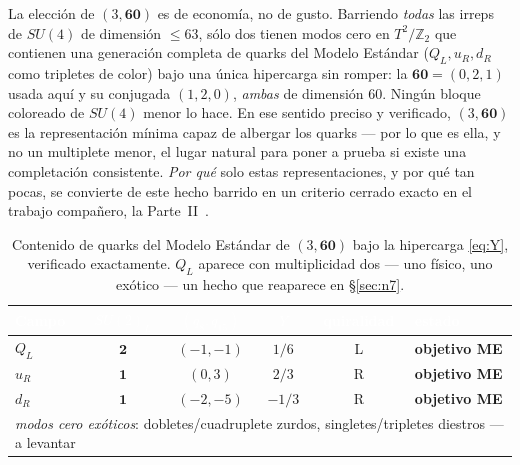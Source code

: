 \documentclass[11pt,a4paper]{article}
\begin{document}
La elecci\'on de $(3,\mathbf{60})$ es de econom\'ia, no de gusto. Barriendo \emph{todas}
las irreps de $SU(4)$ de dimensi\'on $\le 63$, s\'olo dos tienen modos cero en
$T^2/\mathbb{Z}_2$ que contienen una generaci\'on completa de quarks del Modelo Est\'andar
($Q_L,u_R,d_R$ como tripletes de color) bajo una \'unica hipercarga sin romper: la
$\mathbf{60}=(0,2,1)$ usada aqu\'i y su conjugada $(1,2,0)$, \emph{ambas} de dimensi\'on
$60$. Ning\'un bloque coloreado de $SU(4)$ menor lo hace. En ese sentido preciso y
verificado, $(3,\mathbf{60})$ es la representaci\'on m\'inima capaz de albergar los quarks
--- por lo que es ella, y no un multiplete menor, el lugar natural para poner a prueba si
existe una completaci\'on consistente. \emph{Por qu\'e} solo estas representaciones, y por
qu\'e tan pocas, se convierte de este hecho barrido en un criterio cerrado exacto en el
trabajo compa\~nero, la Parte~II~\cite{PartII}.

\begin{table}[t]
\centering
{}
\begin{tabular}{lccccl}
\toprule
\rowcolor{hdrblue}
\textcolor{white}{Campo} & \textcolor{white}{$SU(2)_L$} & \textcolor{white}{$(q_8,q_{15})$}
& \textcolor{white}{$Y$} & \textcolor{white}{quiralidad} & \textcolor{white}{estado}\\
\midrule
$Q_L$   & $\mathbf{2}$ & $(-1,-1)$ & $1/6$  & L & \textcolor{okgreen}{\textbf{objetivo ME}}\\
$u_R$   & $\mathbf{1}$ & $(0,3)$   & $2/3$  & R & \textcolor{okgreen}{\textbf{objetivo ME}}\\
$d_R$   & $\mathbf{1}$ & $(-2,-5)$ & $-1/3$ & R & \textcolor{okgreen}{\textbf{objetivo ME}}\\
\midrule
\multicolumn{6}{l}{\emph{modos cero ex\'oticos}: dobletes/cuadruplete zurdos, singletes/tripletes diestros --- a levantar}\\
\bottomrule
\end{tabular}
\caption{Contenido de quarks del Modelo Est\'andar de $(3,\mathbf{60})$ bajo la hipercarga
\eqref{eq:Y}, verificado exactamente. $Q_L$ aparece con multiplicidad dos --- uno f\'isico,
uno ex\'otico --- un hecho que reaparece en \S\ref{sec:n7}.}
\label{tab:smcontent}
\end{table}

\end{document}

